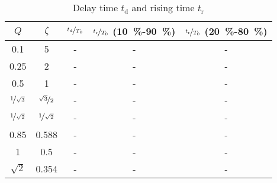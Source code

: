 \documentclass{article}[11pt]
\begin{document}
\begin{table}[H]
\centering
\caption{Delay time $t_{\mathrm{d}}$ and rising time $t_{\mathrm{r}}$}
\begin{tabular}{ccccc}
\toprule
$Q$                      & $\zeta$                   & $\nicefrac{t_{\mathrm{d}}}{T_0}$ & $\nicefrac{t_{\mathrm{r}}}{T_0}$ (\SI{10}{\percent}-\SI{90}{\percent}) & $\nicefrac{t_{\mathrm{r}}}{T_0}$ (\SI{20}{\percent}-\SI{80}{\percent}) \\ \midrule
0.1                      & 5                         & -                                & -                                                                      & -                                                                      \\
0.25                     & 2                         & -                                & -                                                                      & -                                                                      \\ 
0.5                      & 1                         & -                                & -                                                                      & -                                                                      \\ 
$\nicefrac{1}{\sqrt{3}}$ & $\nicefrac{\sqrt{3}}{2}$  & -                                & -                                                                      & -                                                                      \\ 
$\nicefrac{1}{\sqrt{2}}$ & $\nicefrac{1}{\sqrt{2}}$  & -                                & -                                                                      & -                                                                      \\ 
0.85                     & 0.588                     & -                                & -                                                                      & -                                                                      \\ 
1                        & 0.5                       & -                                & -                                                                      & -                                                                      \\ 
$\sqrt{2}$               & 0.354                     & -                                & -                                                                      & -                                                                      \\ 

\end{tabular}
\end{table}
\end{document}
